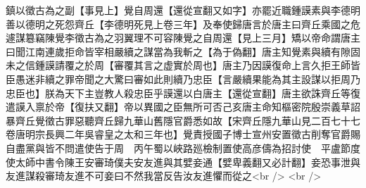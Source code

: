鎮以徵古為之副【事見上】覺自周還【還從宣翻又如字】亦罷近職鍾謨素與李德明善以德明之死怨齊丘【李德明死見上卷三年】及奉使歸唐言於唐主曰齊丘乘國之危遽謀簒竊陳覺李徵古為之羽翼理不可容陳覺之自周還【見上三月】矯以帝命謂唐主曰聞江南連歲拒命皆宰相嚴續之謀當為我斬之【為于偽翻】唐主知覺素與續有隙固未之信鍾謨請覆之於周【審覆其言之虚實於周也】唐主乃因謨復命上言久拒王師皆臣愚迷非續之罪帝聞之大驚曰審如此則續乃忠臣【言嚴續果能為其主設謀以拒周乃忠臣也】朕為天下主豈教人殺忠臣乎謨還以白唐主【還從宣翻】唐主欲誅齊丘等復遣謨入禀於帝【復扶又翻】帝以異國之臣無所可否己亥唐主命知樞密院殷崇義草詔暴齊丘覺徵古罪惡聽齊丘歸九華山舊隱官爵悉如故【宋齊丘隱九華山見二百七十七卷唐明宗長興二年吳睿皇之太和三年也】覺責授國子博士宣州安置徵古削奪官爵賜自盡黨與皆不問遣使告于周　丙午蜀以峽路廵檢制置使高彦儔為招討使　平盧節度使太師中書令陳王安審琦僕夫安友進與其嬖妾通【嬖卑義翻又必計翻】妾恐事泄與友進謀殺審琦友進不可妾曰不然我當反告汝友進懼而從之<br />
<br />
